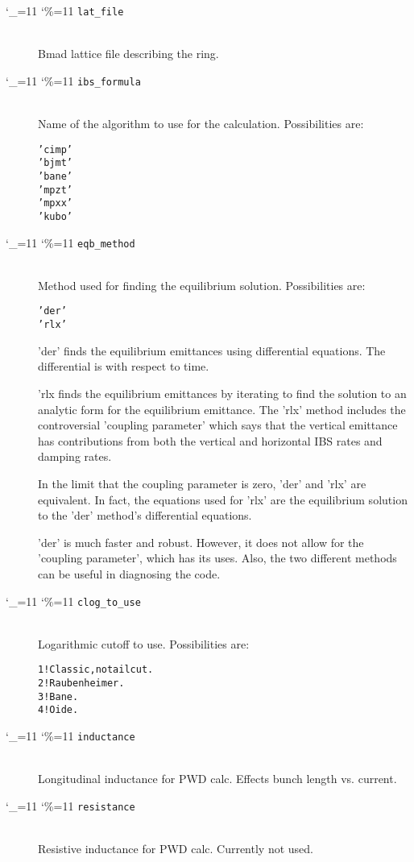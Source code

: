 \documentclass[11pt]{article}
\newcommand\ttcmd{\begingroup\catcode`\_=11 \catcode`\%=11 \dottcmd}
\newcommand\dottcmd[1]{\texttt{#1}\endgroup}
\newcommand{\vn}{\ttcmd}
\newcommand{\Newline}{\hfil \\}
\newlength{\ExBeg}
\newlength{\ExEnd}
\newenvironment{example}
  {\vspace{\ExBeg} \begin{alltt}}
  {\end{alltt} \vspace{\ExEnd}}
\begin{document}
  \begin{description}
  \item[\vn{lat_file}] \Newline
Bmad lattice file describing the ring.

  \item[\vn{ibs_formula}] \Newline
Name of the algorithm to use for the calculation. Possibilities are:
\begin{example}
  'cimp'
  'bjmt'
  'bane'
  'mpzt'
  'mpxx'
  'kubo'
\end{example}

  \item[\vn{eqb_method}] \Newline
Method used for finding the equilibrium solution. Possibilities are:
\begin{example}
  'der'
  'rlx'
\end{example}
'der' finds the equilibrium emittances using differential equations.
The differential is with respect to time.

'rlx finds the equilibrium emittances by iterating to find the
solution to an analytic form for the equilibrium emittance.  The 'rlx'
method includes the controversial 'coupling parameter' which says that
the vertical emittance has contributions from both the vertical and
horizontal IBS rates and damping rates.

In the limit that the coupling parameter is zero, 'der' and 'rlx' are
equivalent.  In fact, the equations used for 'rlx' are the equilibrium
solution to the 'der' method's differential equations.

'der' is much faster and robust.  However, it does not allow for the
'coupling parameter', which has its uses.  Also, the two different
methods can be useful in diagnosing the code.

  \item[\vn{clog_to_use}] \Newline
Logarithmic cutoff to use. Possibilities are:
\begin{example}
  1  ! Classic, no tail cut.  
  2  ! Raubenheimer.  
  3  ! Bane.
  4  ! Oide.  
\end{example} 

  \item[\vn{inductance}] \Newline
Longitudinal inductance for PWD calc.
Effects bunch length vs. current.

  \item[\vn{resistance}] \Newline
Resistive inductance for PWD calc.
Currently not used. 


\end{description}
\end{document}
